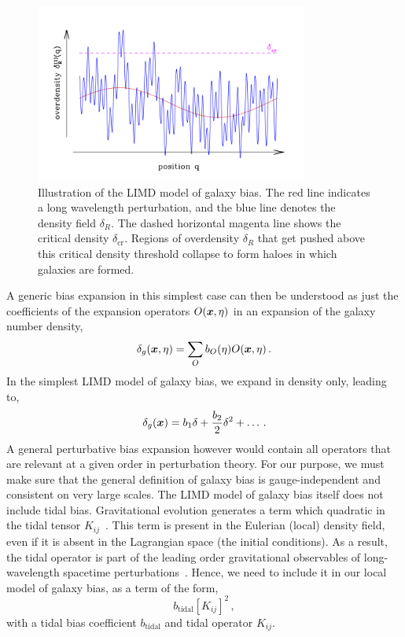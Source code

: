 \begin{figure}[!ht]
	\centering
	\includegraphics[width=0.8\textwidth]{fig/limdcartoon.png}
	\caption{Illustration of the LIMD model of galaxy bias. The red line indicates a long wavelength perturbation, and the blue line denotes the density field $\delta_R$. The dashed horizontal magenta line shows the critical density $\delta_{\mathrm{cr}}$. Regions of overdensity $\delta_R$ that get pushed above this critical density threshold collapse to form haloes in which galaxies are formed.}
	\label{fig:limdcartoon}
\end{figure}
A generic bias expansion in this simplest case can then be understood as just the coefficients of the expansion operators $O(\bm {x},\eta)$ in an expansion of the galaxy number density, 
\begin{equation}
	\delta_g(\bm {x},\eta) = \sum_O b_O(\eta) O(\bm {x},\eta)\,.
\end{equation}
In the simplest LIMD model of galaxy bias, we expand in density only, leading to, 
\begin{equation}
	\delta_g(\bm {x}) = b_1 \delta + \frac{b_2}{2} \delta^2 + \ldots\,.
\end{equation}
A general perturbative bias expansion however would contain all operators that are relevant at a given order in perturbation theory. For our purpose, we must make sure that the general definition of galaxy bias is gauge-independent and consistent on very large scales. The LIMD model of galaxy bias itself does not include tidal bias. Gravitational evolution generates a term which quadratic in the tidal tensor $K_{ij}$~\cite{Baldauf:2012tb}. This term is present in the Eulerian (local) density field, even if it is absent in the Lagrangian space (the initial conditions). As a result, the tidal operator is part of the leading order gravitational observables of long-wavelength spacetime perturbations~\cite{Desjacques:2016bnm}. Hence, we need to include it in our local model of galaxy bias, as a term of the form, 
\begin{equation}
 	b_{\mathrm{tidal}} \left[ K_{ij} \right]^2\,,
\end{equation} 
with a tidal bias coefficient $b_{\mathrm{tidal}}$ and tidal operator $K_{ij}$.

